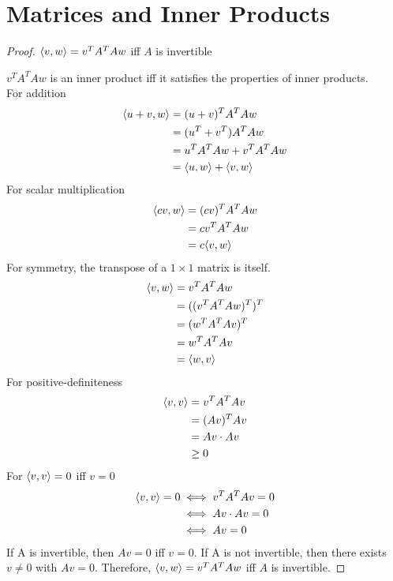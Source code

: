 \section{Matrices and Inner Products}

\begin{proof}$\langle v, w \rangle = v^TA^TAw$ iff $A$ is invertible\gap

    $v^TA^TAw$ is an inner product iff 
    it satisfies the properties of inner products.\\
    For addition
    \begin{align*}
        \langle u + v, w \rangle
        &= (u+v)^T A^T Aw\\
        &= (u^T +v^T) A^T Aw\\
        &= u^T A^T Aw + v^T A^T Aw\\
        &= \langle u, w \rangle + \langle v, w \rangle
    \end{align*}
    For scalar multiplication
    \begin{align*}
        \langle cv, w \rangle
        &= (cv)^T A^T Aw\\
        &= cv^T A^T Aw\\
        &= c\langle v, w \rangle
    \end{align*}
    For symmetry, the transpose of a $1 \times 1$ matrix is itself. 
    \begin{align*}
        \langle v, w \rangle
        &= v^T A^T A w\\
        &= ((v^T A^T A w)^T)^T\\
        &= (w^T A^T A v)^T\\
        &= w^T A^T A v\\
        &= \langle w, v \rangle
    \end{align*}
    For positive-definiteness
    \begin{align*}
        \langle v, v \rangle
        &= v^TA^T Av\\
        &= (Av)^T Av\\
        &= Av \cdot Av\\
        &\geq 0
    \end{align*}
    For $\langle v, v \rangle = 0$ iff $v = 0$
    \begin{align*}
        \langle v, v \rangle = 0
        &\iff v^TA^T Av = 0\\
        &\iff Av \cdot Av = 0\\
        &\iff Av = 0
    \end{align*}
    If A is invertible, then $Av = 0$ iff $v = 0$.
    If A is not invertible, then there exists $v \neq 0$ with $Av = 0$.
    Therefore, $\langle v, w \rangle = v^TA^TAw$ iff $A$ is invertible.
\end{proof}